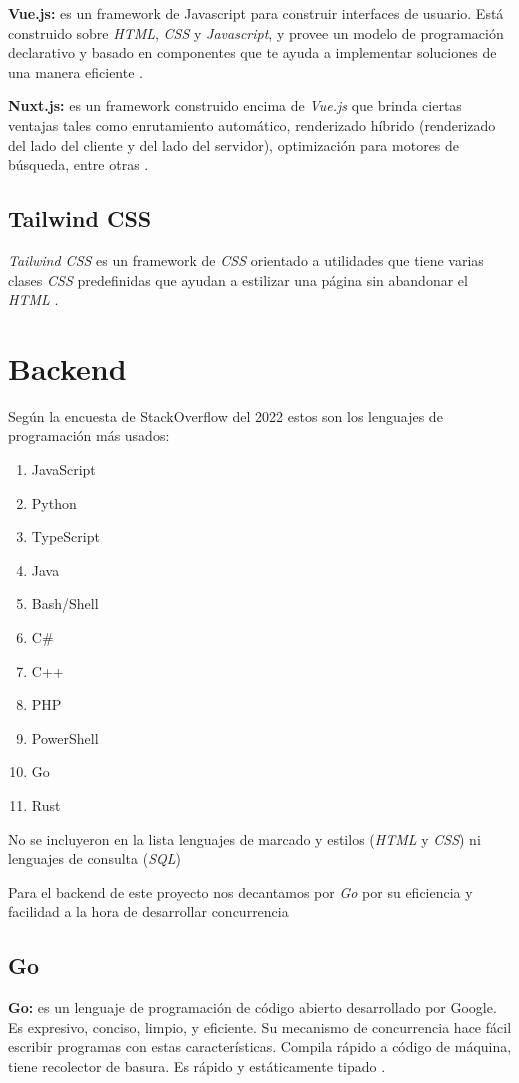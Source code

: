 \textbf{Vue.js:} es un framework de Javascript para construir interfaces de usuario. Está construido sobre \textit{HTML}, \textit{CSS} y \textit{Javascript}, y provee un modelo de programación declarativo y basado en componentes que te ayuda a implementar soluciones de una manera eficiente \cite{vue}.
\newline

\textbf{Nuxt.js:} es un framework construido encima de \textit{Vue.js} que brinda ciertas ventajas tales como enrutamiento automático, renderizado híbrido (renderizado del lado del cliente y del lado del servidor), optimización para motores de búsqueda, entre otras \cite{nuxt}.

\subsection{Tailwind CSS}
\textit{Tailwind CSS} es un framework de \textit{CSS} orientado a utilidades que tiene varias clases \textit{CSS} predefinidas que ayudan a estilizar una página sin abandonar el \textit{HTML} \cite{tailwind}.

\section{Backend}
Según la encuesta de StackOverflow del 2022 \cite{encuesta2022} estos son los lenguajes de programación más usados: 
\begin{enumerate}
	\item JavaScript
	\item Python
	\item TypeScript
	\item Java
	\item Bash/Shell
	\item C\#
	\item C++
	\item PHP
	\item PowerShell
	\item Go
	\item Rust
\end{enumerate}
No se incluyeron en la lista lenguajes de marcado y estilos (\textit{HTML} y \textit{CSS}) ni lenguajes de consulta (\textit{SQL})
\newline

Para el backend de este proyecto nos decantamos por \textit{Go} por su eficiencia y facilidad a la hora de desarrollar concurrencia
\subsection{Go}
\textbf{Go:} es un lenguaje de programación de código abierto desarrollado por Google. Es expresivo, conciso, limpio, y eficiente. Su mecanismo de concurrencia hace fácil escribir programas con estas características. Compila rápido a código de máquina, tiene recolector de basura. Es rápido y estáticamente tipado \cite{golang}.
\newline

